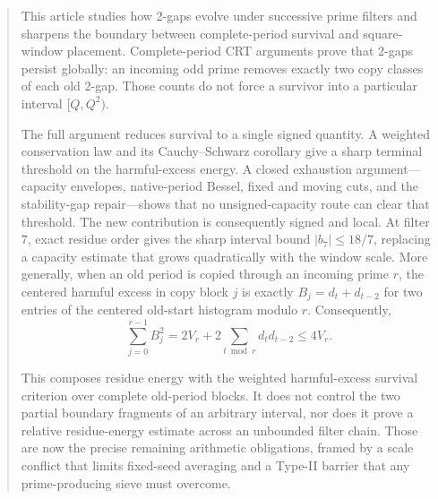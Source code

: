 \begin{abstract}
This article studies how 2-gaps evolve under successive prime filters and
sharpens the boundary between complete-period survival and square-window
placement. Complete-period CRT arguments prove that 2-gaps persist
globally: an incoming odd prime removes exactly two copy classes of each
old 2-gap. Those counts do not force a survivor into a particular
interval $[Q,Q^2)$.

The full argument reduces survival to a single signed quantity. A
weighted conservation law and its Cauchy--Schwarz corollary give a sharp
terminal threshold on the harmful-excess energy. A closed exhaustion
argument---capacity envelopes, native-period Bessel, fixed and moving
cuts, and the stability-gap repair---shows that no unsigned-capacity
route can clear that threshold. The new contribution is consequently
signed and local. At filter $7$, exact residue order gives the sharp
interval bound $|b_7|\le18/7$, replacing a capacity estimate that grows
quadratically with the window scale. More generally, when an old period
is copied through an incoming prime $r$, the centered harmful excess in
copy block $j$ is exactly $B_j=d_t+d_{t-2}$ for two entries of the
centered old-start histogram modulo $r$. Consequently,
\begin{equation*}
\sum_{j=0}^{r-1}B_j^2
=2V_r+2\sum_{t\bmod r}d_td_{t-2}
\le4V_r.
\end{equation*}

This composes residue energy with the weighted harmful-excess survival
criterion over complete old-period blocks. It does not control the two
partial boundary fragments of an arbitrary interval, nor does it prove a
relative residue-energy estimate across an unbounded filter chain. Those
are now the precise remaining arithmetic obligations, framed by a scale
conflict that limits fixed-seed averaging and a Type-II barrier that any
prime-producing sieve must overcome.
\end{abstract}
